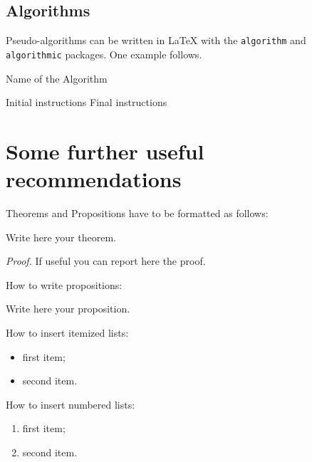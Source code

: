 \documentclass[11pt,a4paper,twocolumn]{article}
\begin{document}
\subsection{Algorithms}
\label{subsec:algorithms}

Pseudo-algorithms can be written in \LaTeX{} with the \texttt{algorithm} and \texttt{algorithmic} packages.
One example follows.
\begin{algorithm}[H]
\label{alg:example}
\caption{Name of the Algorithm}
\label{alg:var}
\label{protocol1}
\begin{algorithmic}[1]
\STATE Initial instructions
\ENDIF
\ENDFOR
{}
\ENDWHILE
\STATE Final instructions
\end{algorithmic}
\end{algorithm} 

\section{Some further useful recommendations}

Theorems and Propositions have to be formatted as follows:
\begin{theorem}
\label{a_theorem}
Write here your theorem. 
\end{theorem}
\textit{Proof.} If useful you can report here the proof.
\vspace{0.3cm} %

How to write propositions:
\begin{proposition}
Write here your proposition.
\end{proposition}
\vspace{0.3cm} %

How to insert itemized lists:
\begin{itemize}
    \item first item;
    \item second item.
\end{itemize}
How to insert numbered lists:
\begin{enumerate}
    \item first item;
    \item second item.
\end{enumerate}

\end{document}
